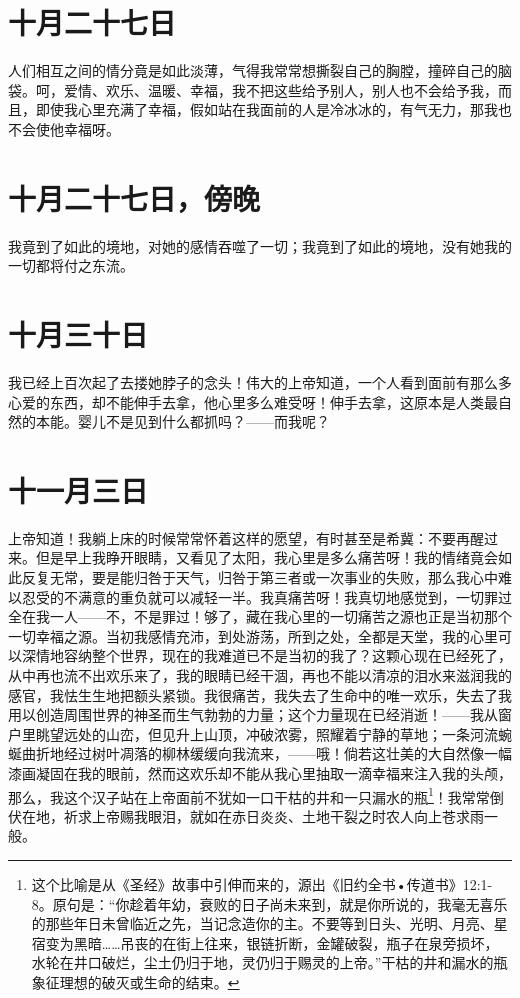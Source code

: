\documentclass[12pt,oneside]{book}
\begin{document}
\chapter{十月二十七日}
人们相互之间的情分竟是如此淡薄，气得我常常想撕裂自己的胸膛，撞碎自己的脑袋。呵，爱情、欢乐、温暖、幸福，我不把这些给予别人，别人也不会给予我，而且，即使我心里充满了幸福，假如站在我面前的人是冷冰冰的，有气无力，那我也不会使他幸福呀。
　　
\chapter{十月二十七日，傍晚}
我竟到了如此的境地，对她的感情吞噬了一切；我竟到了如此的境地，没有她我的一切都将付之东流。
　　

\chapter{十月三十日}
我已经上百次起了去搂她脖子的念头！伟大的上帝知道，一个人看到面前有那么多心爱的东西，却不能伸手去拿，他心里多么难受呀！伸手去拿，这原本是人类最自然的本能。婴儿不是见到什么都抓吗？——而我呢？
　　

\chapter{十一月三日}
上帝知道！我躺上床的时候常常怀着这样的愿望，有时甚至是希冀：不要再醒过来。但是早上我睁开眼睛，又看见了太阳，我心里是多么痛苦呀！我的情绪竟会如此反复无常，要是能归咎于天气，归咎于第三者或一次事业的失败，那么我心中难以忍受的不满意的重负就可以减轻一半。我真痛苦呀！我真切地感觉到，一切罪过全在我一人——不，不是罪过！够了，藏在我心里的一切痛苦之源也正是当初那个一切幸福之源。当初我感情充沛，到处游荡，所到之处，全都是天堂，我的心里可以深情地容纳整个世界，现在的我难道已不是当初的我了？这颗心现在已经死了，从中再也流不出欢乐来了，我的眼睛已经干涸，再也不能以清凉的泪水来滋润我的感官，我怯生生地把额头紧锁。我很痛苦，我失去了生命中的唯一欢乐，失去了我用以创造周围世界的神圣而生气勃勃的力量；这个力量现在已经消逝！——我从窗户里眺望远处的山峦，但见升上山顶，冲破浓雾，照耀着宁静的草地；一条河流蜿蜒曲折地经过树叶凋落的柳林缓缓向我流来，——哦！倘若这壮美的大自然像一幅漆画凝固在我的眼前，然而这欢乐却不能从我心里抽取一滴幸福来注入我的头颅，那么，我这个汉子站在上帝面前不犹如一口干枯的井和一只漏水的瓶\footnote{这个比喻是从《圣经》故事中引伸而来的，源出《旧约全书•传道书》12:1-8。原句是：“你趁着年幼，衰败的日子尚未来到，就是你所说的，我毫无喜乐的那些年日未曾临近之先，当记念造你的主。不要等到日头、光明、月亮、星宿变为黑暗……吊丧的在街上往来，银链折断，金罐破裂，瓶子在泉旁损坏，水轮在井口破烂，尘土仍归于地，灵仍归于赐灵的上帝。”干枯的井和漏水的瓶象征理想的破灭或生命的结束。}！我常常倒伏在地，祈求上帝赐我眼泪，就如在赤日炎炎、土地干裂之时农人向上苍求雨一般。
\end{document}
